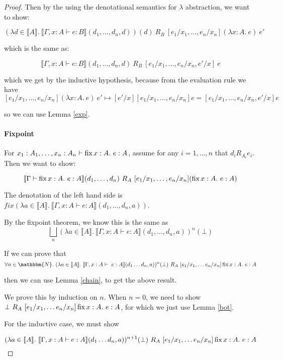 \begin{proof}
Then by the using the denotational semantics for $\lambda$ abstraction, we want to show:

\[ (\lambda d \in \llbracket A \rrbracket. \ \llbracket \Gamma, x :A \vdash e : B \rrbracket (d_1, \dots, d_n,d))(d) \ R_B \ [e_1/x_1, \dots, e_n/x_n] (\lambda x:A. \ e) \ e'\]

which is the same as:

\[ \llbracket \Gamma, x :A \vdash e : B \rrbracket (d_1, \dots, d_n, d) \ R_B \ [e_1/x_1, \dots, e_n/x_n, e'/x] \ e \]

which we get by the inductive hypothesis, because from the evaluation rule we have \[[e_1/x_1, \dots, e_n/x_n] (\lambda x:A. \ e) \ e'  \mapsto [e'/x][e_1/x_1, \dots, e_n/x_n]e = [e_1/x_1, \dots, e_n/x_n, e'/x]e\]

 so we can use Lemma \ref{exp}. 

\paragraph{Fixpoint}
For $x_1 : A_1, \dots, x_n : A_n \vdash \operatorname{fix} x:A. \ e : A$, assume for any $i = 1, \dots, n$ that $d_i R_{A_i} e_i$. Then we want to show:

\[ \llbracket \Gamma \vdash \operatorname{fix} x:A. \ e : A \rrbracket (d_1, \dots, d_n) \ R_A \ [e_1/x_1, \dots, e_n/x_n] (\operatorname{fix} x:A. \ e : A) \]

The denotation of the left hand side is $fix( \lambda a \in \llbracket A \rrbracket. \  \llbracket \Gamma, x :A \vdash e : A \rrbracket(d_1, \dots, d_n, a))$.

By the fixpoint theorem, we know this is the same as 
\[\bigsqcup_n (\lambda a \in \llbracket A \rrbracket. \  \llbracket \Gamma, x :A \vdash e : A \rrbracket(d_1, \dots, d_n, a))^n(\bot)\]


If we can prove that \[\forall n \in \mathbbm{N}. \ (\lambda a \in \llbracket A \rrbracket. \ \llbracket \Gamma, x : A \vdash \ e : A \rrbracket(d_1 \dots d_n, a))^n(\bot) \ R_A \ [e_1/x_1, \dots e_n/x_n]\fix x : A. \ e : A\]

then we can use Lemma \ref{chain}, to get the above result.

We prove this by induction on $n$. When $n = 0$, we need to show $\bot \ R_A \ [e_1/x_1, \dots e_n/x_n]\operatorname{fix} x : A. \ e : A$, for which we just use Lemma \ref{bot}.

For the inductive case, we must show 

\[(\lambda a \in \llbracket A \rrbracket. \ \llbracket \Gamma, x : A \vdash e : A \rrbracket(d_1 \dots d_n,a))^{n+1}(\bot) \ R_A \ [e_1/x_1, \dots e_n/x_n]\operatorname{fix} x : A. \ e : A\]


\end{proof}
